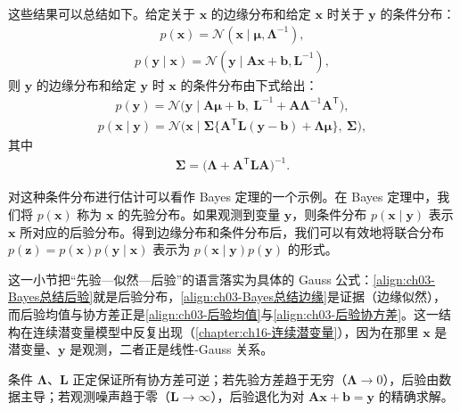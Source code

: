 \documentclass[../../main.tex]{subfiles}
\begin{document}
这些结果可以总结如下。给定关于 $\boldsymbol{x}$ 的边缘分布和给定 $\boldsymbol{x}$ 时关于 $\boldsymbol{y}$ 的条件分布：
\begin{align}
p(\boldsymbol{x})=\mathcal{N}(\boldsymbol{x}\mid\boldsymbol{\mu},\boldsymbol{\Lambda}^{-1}),
\label{align:ch03-Bayes总结先验}
\end{align}
\begin{align}
p(\boldsymbol{y}\mid\boldsymbol{x})=\mathcal{N}(\boldsymbol{y}\mid\boldsymbol{A}\boldsymbol{x}+\boldsymbol{b},\boldsymbol{L}^{-1}),
\label{align:ch03-Bayes总结条件}
\end{align}
则 $\boldsymbol{y}$ 的边缘分布和给定 $\boldsymbol{y}$ 时 $\boldsymbol{x}$ 的条件分布由下式给出：
\begin{align}
p(\boldsymbol{y})=\mathcal{N}\bigl(\boldsymbol{y}\mid\boldsymbol{A}\boldsymbol{\mu}+\boldsymbol{b},\ \boldsymbol{L}^{-1}+\boldsymbol{A}\boldsymbol{\Lambda}^{-1}\boldsymbol{A}^{\mathsf{T}}\bigr),
\label{align:ch03-Bayes总结边缘}
\end{align}
\begin{align}
p(\boldsymbol{x}\mid\boldsymbol{y})=\mathcal{N}\bigl(\boldsymbol{x}\mid\boldsymbol{\Sigma}\{\boldsymbol{A}^{\mathsf{T}}\boldsymbol{L}(\boldsymbol{y}-\boldsymbol{b})+\boldsymbol{\Lambda}\boldsymbol{\mu}\},\ \boldsymbol{\Sigma}\bigr),
\label{align:ch03-Bayes总结后验}
\end{align}
其中
\begin{align}
\boldsymbol{\Sigma}=\bigl(\boldsymbol{\Lambda}+\boldsymbol{A}^{\mathsf{T}}\boldsymbol{L}\boldsymbol{A}\bigr)^{-1}.
\label{align:ch03-Bayes总结后验协方差}
\end{align}

对这种条件分布进行估计可以看作 Bayes 定理的一个示例。在 Bayes 定理中，我们将 $p(\boldsymbol{x})$ 称为 $\boldsymbol{x}$ 的先验分布。如果观测到变量 $\boldsymbol{y}$，则条件分布 $p(\boldsymbol{x}\mid\boldsymbol{y})$ 表示 $\boldsymbol{x}$ 所对应的后验分布。得到边缘分布和条件分布后，我们可以有效地将联合分布 $p(\boldsymbol{z})=p(\boldsymbol{x})p(\boldsymbol{y}\mid\boldsymbol{x})$ 表示为 $p(\boldsymbol{x}\mid\boldsymbol{y})p(\boldsymbol{y})$ 的形式。

\begin{remark}
这一小节把“先验—似然—后验”的语言落实为具体的 Gauss 公式：\eqref{align:ch03-Bayes总结后验}就是后验分布，\eqref{align:ch03-Bayes总结边缘}是证据（边缘似然），而后验均值与协方差正是\eqref{align:ch03-后验均值}与\eqref{align:ch03-后验协方差}。这一结构在连续潜变量模型中反复出现（\cref{chapter:ch16-连续潜变量}），因为在那里 $\boldsymbol{x}$ 是潜变量、$\boldsymbol{y}$ 是观测，二者正是线性-Gauss 关系。

条件 $\boldsymbol{\Lambda}$、$\boldsymbol{L}$ 正定保证所有协方差可逆；若先验方差趋于无穷（$\boldsymbol{\Lambda}\to0$），后验由数据主导；若观测噪声趋于零（$\boldsymbol{L}\to\infty$），后验退化为对 $\boldsymbol{A}\boldsymbol{x}+\boldsymbol{b}=\boldsymbol{y}$ 的精确求解。
\end{remark}
\end{document}
